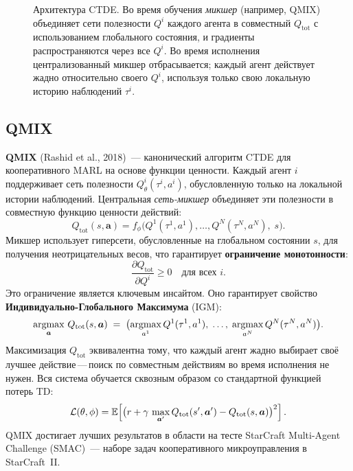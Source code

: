 \begin{figure}[ht]
\caption{Архитектура CTDE. Во время обучения \emph{микшер}
  (например, QMIX) объединяет сети полезности $Q^i$ каждого агента в
  совместный $Q_\mathrm{tot}$ с использованием глобального состояния, и градиенты
  распространяются через все $Q^i$. Во время исполнения централизованный микшер
  отбрасывается; каждый агент действует жадно относительно своего $Q^i$,
  используя только свою локальную историю наблюдений $\tau^i$.}
\label{fig:ctde}
\end{figure}

\subsection{QMIX}

\textbf{QMIX} (Rashid et al., 2018)~--- канонический алгоритм CTDE
для кооперативного MARL на основе функции ценности. Каждый
агент $i$ поддерживает сеть полезности
$Q^i_\theta(\tau^i, a^i)$, обусловленную только на локальной
истории наблюдений. Центральная \emph{сеть-микшер} объединяет эти
полезности в совместную функцию ценности действий:
\begin{equation}
\label{eq:qmix}
Q_\mathrm{tot}(s, \bm{a}) = f_\phi\!\bigl(Q^1(\tau^1, a^1), \ldots,
  Q^N(\tau^N, a^N),\; s\bigr).
\end{equation}
Микшер использует гиперсети, обусловленные на
глобальном состоянии $s$, для получения неотрицательных весов, что гарантирует
\textbf{ограничение монотонности}:
\[
  \frac{\partial Q_\mathrm{tot}}{\partial Q^i} \geq 0
  \quad \mbox{для всех } i.
\]
Это ограничение является ключевым инсайтом. Оно гарантирует
свойство \textbf{Индивидуально-Глобального Максимума} (IGM):
\[
  \operatorname*{argmax}_{\bm{a}}\, Q_\mathrm{tot}(s, \bm{a})
  \;=\; \bigl(\operatorname*{argmax}_{a^1} Q^1(\tau^1, a^1),\; \ldots,\;
               \operatorname*{argmax}_{a^N} Q^N(\tau^N, a^N)\bigr).
\]
Максимизация $Q_\mathrm{tot}$ эквивалентна тому, что каждый агент
жадно выбирает своё лучшее действие\,---\,поиск по совместным действиям
во время исполнения не нужен. Вся система обучается сквозным образом
со стандартной функцией потерь TD:
\begin{equation}
\label{eq:qmix-loss}
\mathcal{L}(\theta, \phi) = \operatorname{\mathbb{E}}\!\left[
  \bigl(r + \gamma\, \max_{\bm{a}'} Q_\mathrm{tot}(s', \bm{a}')
  - Q_\mathrm{tot}(s, \bm{a})\bigr)^2
\right].
\end{equation}
QMIX достигает лучших результатов в области на тесте StarCraft
Multi-Agent Challenge (SMAC)~--- наборе задач кооперативного
микроуправления в StarCraft~II.

